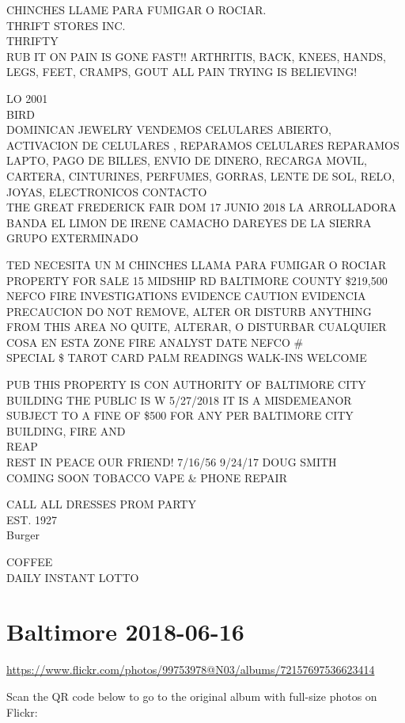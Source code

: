 \documentclass[10pt,letterpaper]{article}
\begin{document}
CHINCHES LLAME PARA FUMIGAR O ROCIAR.\\
THRIFT STORES INC.\\
THRIFTY\\
RUB IT ON PAIN IS GONE FAST!! ARTHRITIS, BACK, KNEES, HANDS, LEGS, FEET, CRAMPS, GOUT ALL PAIN TRYING IS BELIEVING!

LO 2001\\
BIRD\\
DOMINICAN JEWELRY VENDEMOS CELULARES ABIERTO, ACTIVACION DE CELULARES , REPARAMOS CELULARES REPARAMOS LAPTO, PAGO DE BILLES, ENVIO DE DINERO, RECARGA MOVIL, CARTERA, CINTURINES, PERFUMES, GORRAS, LENTE DE SOL, RELO, JOYAS, ELECTRONICOS CONTACTO\\
THE GREAT FREDERICK FAIR DOM 17 JUNIO 2018 LA ARROLLADORA BANDA EL LIMON DE IRENE CAMACHO DAREYES DE LA SIERRA GRUPO EXTERMINADO

TED NECESITA UN M CHINCHES LLAMA PARA FUMIGAR O ROCIAR\\
PROPERTY FOR SALE 15 MIDSHIP RD BALTIMORE COUNTY \$219,500\\
NEFCO FIRE INVESTIGATIONS EVIDENCE CAUTION EVIDENCIA PRECAUCION DO NOT REMOVE, ALTER OR DISTURB ANYTHING FROM THIS AREA NO QUITE, ALTERAR, O DISTURBAR CUALQUIER COSA EN ESTA ZONE FIRE ANALYST DATE NEFCO \#\\
SPECIAL \$ TAROT CARD PALM READINGS WALK{-}INS WELCOME

PUB THIS PROPERTY IS CON AUTHORITY OF BALTIMORE CITY BUILDING THE PUBLIC IS W 5/27/2018 IT IS A MISDEMEANOR SUBJECT TO A FINE OF \$500 FOR ANY PER BALTIMORE CITY BUILDING, FIRE AND\\
REAP\\
REST IN PEACE OUR FRIEND!  7/16/56 9/24/17 DOUG SMITH\\
COMING SOON TOBACCO VAPE \& PHONE REPAIR

CALL ALL DRESSES PROM PARTY\\
EST. 1927\\
Burger

COFFEE\\
DAILY INSTANT LOTTO
\pagebreak

\section*{Baltimore 2018-06-16}

\url{https://www.flickr.com/photos/99753978@N03/albums/72157697536623414}

Scan the QR code below to go to the original album with full-size photos on Flickr:
\end{document}
